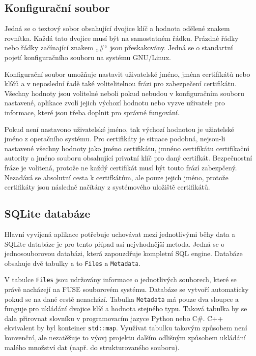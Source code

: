 \subsection{Konfigurační soubor}
\label{subsec:config}

Jedná se o textový sobor obsahující dvojice klíč a hodnota odělené znakem rovnítka. Každá tato dvojice musí být na samostatném řádku. Prázdné řádky nebo řádky
začínající znakem „\#“ jsou přeskakovány. Jedná se o standartní pojetí konfiguračního souboru na systému GNU/Linux.

Konfigurační soubor umožňuje nastavit uživatelské jméno, jména certifíkátů nebo klíčů a v neposlední řadě také volitelitelnou frázi pro zabezpečení certifikátu.
Všechny hodnoty jsou volitelné neboli pokud nebudou v konfiguračním souboru nastavené, aplikace zvolí jejich výchozí hodnotu nebo vyzve uživatele pro informace,
které jsou třeba doplnit pro správné fungování.

Pokud není nastavono uživatelské jméno, tak výchozí hodnotou je užiatelské jméno z operačního systému. Pro certifikáty je situace podobná, nejsou-li nastavené
všechny hodnoty jako jméno certifikátu, jmnéno certifikátu certifikační autority a jméno souboru obsahující privatní klíč pro daný certifkát. Bezpečnostní fráze 
je volitená, protože ne každý certifikát musí být touto frází zabezpčený. Nezadává se absolutní cesta k certifkátům, ale pouze jejich jméno, protože certifikáty
jsou následně načítány z systémového uložiště certifikátů.

\subsection{SQLite databáze}

Hlavní vyvíjená aplikace potřebuje uchovávat mezi jednotlivými běhy data a SQLite databáze je pro tento případ asi nejvhodnější metoda. Jedná se o jednosouborovou databázi,
která zapouzdřuje kompletní SQL engine. Databáze obsahuje dvě tabulky a to \texttt{Files} a \texttt{Metadata}. 

V tabulce \texttt{Files} jsou udržovány informace o jednotlivých souborech, které se právě nacházejí na FUSE souborovém systému.  Databáze se vytvoří automaticky pokud se 
na dané cestě nenachází. Tabulka \texttt{Metadata} má pouze dva sloupce a funguje pro ukládání dvojice klíč a hodnota stejného typu. Taková tabulka by se dala přirovnat 
slovníku v programovacím jazyce Python nebo C\#. C++ ekvivalent by byl konteiner \texttt{std::map}. Využívat tabulku takovým způsobem není konvenční, ale nezatěžuje to
výovj projektu dalším odlišným způsobem ukládání malého množství dat (např. do strukturovaného souboru).

